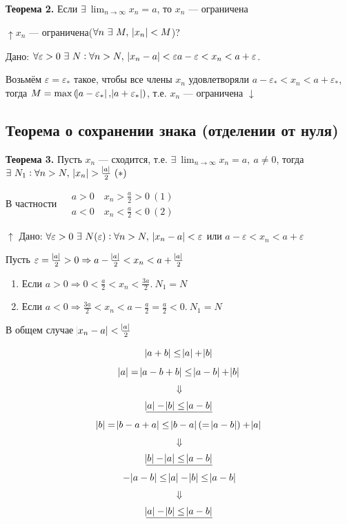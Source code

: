 \documentclass{article}
\begin{document}
    \textbf{Теорема 2.} Если \(\exists\ \lim_{n \rightarrow \infty}{x_n} = a\), то \(x_n\) --- ограничена
    
    \(\uparrow x_n\) --- ограничена(\(\forall n\ \exists\ M,\ \abs{x_n} < M\))?
    
    Дано: \(\forall \varepsilon > 0\ \exists\ N : \forall n > N,\ \abs{x_n - a} < \varepsilon\\ a - \varepsilon < x_n < a + \varepsilon\).
    
    Возьмём \(\varepsilon = \varepsilon_*\) такое, чтобы все члены \(x_n\) удовлетворяли \(a - \varepsilon_* < x_n < a + \varepsilon_*\), тогда \(M = \max{(\abs{a - \varepsilon_*}, \abs{a + \varepsilon_*})}\), т.е. \(x_n\) --- ограничена \(\downarrow\)
    
    \subsection{Теорема о сохранении знака (отделении от нуля)}
    
    \textbf{Теорема 3.} Пусть \(x_n\) --- сходится, т.е. \(\exists\ \lim_{n \rightarrow \infty}{x_n} = a,\ a \not = 0\), тогда \(\exists\ N_1 : \forall n > N,\ \abs{x_n} > \frac{\abs{a}}{2}\ (*)\)
    
    В частности \(\begin{aligned}
    	&a > 0 \quad x_n > \frac{a}{2} > 0\ (1)\\
        &a < 0 \quad x_n < \frac{a}{2} < 0\ (2)
    \end{aligned}\)
    
    \(\uparrow\) Дано: \(\forall \varepsilon > 0\ \exists\ N(\varepsilon) : \forall n > N,\ \abs{x_n - a} < \varepsilon\) или \(a - \varepsilon < x_n < a + \varepsilon\)
    
    Пусть \(\varepsilon = \frac{\abs{a}}{2} > 0 \Rightarrow a - \frac{\abs{a}}{2} < x_n < a + \frac{\abs{a}}{2}\)
    \begin{enumerate}
    	\item Если \(a > 0 \Rightarrow 0 < \frac{a}{2} < x_n < \frac{3a}{2}.\ N_1 = N\)
        \item Если \(a < 0 \Rightarrow \frac{3a}{2} < x_n < a - \frac{a}{2} = \frac{a}{2} < 0.\ N_1 = N\)
    \end{enumerate}
    
    В общем случае \(\abs{x_n - a} < \frac{\abs{a}}{2}\)
    
    \[\abs{a + b} \leq \abs{a} + \abs{b}\]
    \[\abs{a} = \abs{a - b + b} \leq \abs{a - b} + \abs{b}\]
    \[\Downarrow\]
    \[\underline{\abs{a} - \abs{b} \leq \abs{a - b}}\]
    \[\abs{b} = \abs{b - a + a} \leq \abs{b - a}(= \abs{a - b}) + \abs{a}\]
    \[\Downarrow\]
    \[\underline{\abs{b} - \abs{a} \leq \abs{a - b}}\]
    \[-\abs{a-b} \leq \abs{a} - \abs{b} \leq \abs{a - b}\]
    \[\Downarrow\]
    \[\underline{\abs{a} - \abs{b} \leq \abs{a - b}}\]
    
\end{document}

